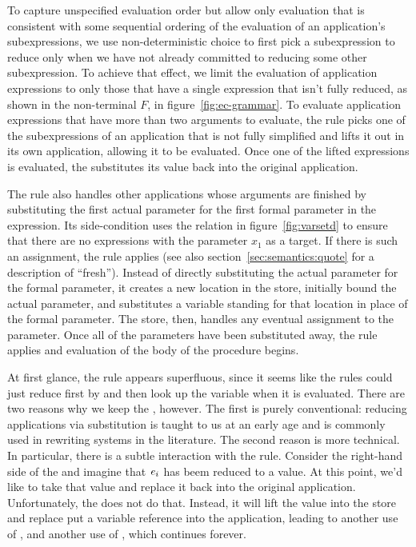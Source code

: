 To capture unspecified evaluation order but allow only evaluation that
is consistent with some sequential ordering of the evaluation of an
application's subexpressions, we use non-deterministic choice to first pick
a subexpression to reduce only when we have not already committed to
reducing some other subexpression. To achieve that effect, we limit
the evaluation of application expressions to only those that have a
single expression that isn't fully reduced, as shown in the
non-terminal $F$, in figure~\ref{fig:ec-grammar}. To evaluate
application expressions that have more than two arguments to evaluate,
the rule  picks one of the subexpressions of an
application that is not fully simplified and lifts it out in its own
application, allowing it to be evaluated. Once one of the lifted
expressions is evaluated, the  substitutes its value
back into the original application.

The  rule also handles other applications whose
arguments are finished by substituting the first actual parameter for
the first formal parameter in the expression. Its side-condition uses
the relation in figure~\ref{fig:varsetd} to ensure that there are no
 expressions with the parameter $x_1$ as a target.
If there is such an assignment, the  rule applies (see also section~\ref{sec:semantics:quote} for a description of ``fresh'').
Instead of directly substituting the actual parameter for the formal
parameter, it creates a new location in the store, initially bound the
actual parameter, and substitutes a variable standing for that
location in place of the formal parameter. The store, then, handles
any eventual assignment to the parameter. Once all of the parameters
have been substituted away, the rule  applies and
evaluation of the body of the procedure begins.

At first glance, the rule  appears superfluous, since it seems like the rules could just reduce first by  and then look up the variable when it is evaluated. 
There are two reasons why we keep the , however. 
The first is purely conventional: reducing applications via substitution is taught to us at an early age and is commonly used in rewriting systems in the literature.
The second reason is more technical. In particular, there is a subtle interaction with the  rule. 
Consider the right-hand side of the  and imagine that $\textnormal{\textit{e}}_i$ has beem reduced to a value. At this point, we'd like to take that value and replace it back into the original application. Unfortunately, the  does not do that. 
Instead, it will lift the value into the store and replace put a variable reference into the application, leading to another use of , and another use of , which continues forever.

